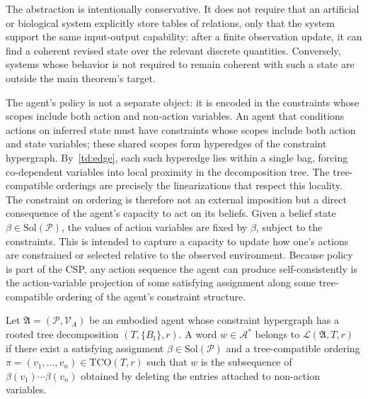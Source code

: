 \documentclass[runningheads]{llncs}
\begin{document}
The abstraction is intentionally conservative. It does not require that an artificial or biological system explicitly store tables of relations, only that the system support the same input-output capability: after a finite observation update, it can find a coherent revised state over the relevant discrete quantities. Conversely, systems whose behavior is not required to remain coherent with such a state are outside the main theorem's target.

\begin{remark}\label{rem:policy}
The agent's policy is not a separate object: it is encoded in the constraints whose scopes include both action and non-action variables. An agent that conditions actions on inferred state must have constraints whose scopes include both action and state variables; these shared scopes form hyperedges of the constraint hypergraph. By~\ref{td:edge}, each such hyperedge lies within a single bag, forcing co-dependent variables into local proximity in the decomposition tree. The tree-compatible orderings are precisely the linearizations that respect this locality. The constraint on ordering is therefore not an external imposition but a direct consequence of the agent's capacity to act on its beliefs. Given a belief state $\beta \in \mathrm{Sol}(\mathcal{P})$, the values of action variables are fixed by $\beta$, subject to the constraints. This is intended to capture a capacity to update how one's actions are constrained or selected relative to the observed environment. Because policy is part of the CSP, any action sequence the agent can produce self-consistently is the action-variable projection of some satisfying assignment along some tree-compatible ordering of the agent's constraint structure.
\end{remark}

\begin{definition}\label{def:behavior-language}
Let $\mathfrak{A} = (\mathcal{P}, \mathcal{V}_A)$ be an embodied agent whose constraint hypergraph has a rooted tree decomposition $(T, \{B_t\}, r)$. A word $w \in \mathcal{A}^*$ belongs to $\mathcal{L}(\mathfrak{A}, T, r)$ if there exist a satisfying assignment $\beta \in \mathrm{Sol}(\mathcal{P})$ and a tree-compatible ordering $\pi = (v_1, \ldots, v_n) \in \mathrm{TCO}(T, r)$ such that $w$ is the subsequence of $\beta(v_1)\cdots\beta(v_n)$ obtained by deleting the entries attached to non-action variables.
\end{definition}
\end{document}
